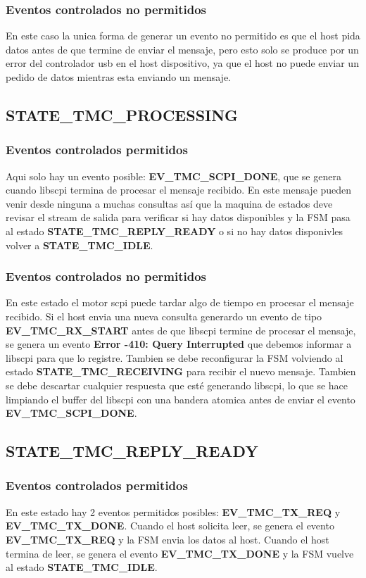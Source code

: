 \subsubsection*{Eventos controlados no permitidos}
En este caso la unica forma de generar un evento no permitido es que el host pida datos antes de que termine de enviar el mensaje, pero esto solo se produce por un error del controlador usb en el host dispositivo, ya que el host no puede enviar un pedido de datos mientras esta enviando un mensaje.

\subsection{STATE\_TMC\_PROCESSING}
\subsubsection{Eventos controlados permitidos}
Aqui solo hay un evento posible: \textbf{EV\_TMC\_SCPI\_DONE}, que se genera cuando libscpi termina de procesar el mensaje recibido. En este mensaje pueden venir desde ninguna a muchas consultas así que la maquina de estados deve revisar el stream de salida para verificar si hay datos disponibles y la FSM pasa al estado \textbf{STATE\_TMC\_REPLY\_READY} o si no hay datos disponivles volver a \textbf{STATE\_TMC\_IDLE}.

\subsubsection{Eventos controlados no permitidos}
En este estado el motor scpi puede tardar algo de tiempo en procesar el mensaje recibido. Si el host envia una nueva consulta generardo un evento de tipo \textbf{EV\_TMC\_RX\_START} antes de que libscpi termine de procesar el mensaje, se genera un evento \textbf{Error -410: Query Interrupted} que debemos informar a libscpi para que lo registre. Tambien se debe reconfigurar la FSM volviendo al estado \textbf{STATE\_TMC\_RECEIVING} para recibir el nuevo mensaje. Tambien se debe descartar cualquier respuesta que esté generando libscpi, lo que se hace limpiando el buffer del libscpi con una bandera atomica antes de enviar el evento \textbf{EV\_TMC\_SCPI\_DONE}.

\subsection{STATE\_TMC\_REPLY\_READY}
\subsubsection{Eventos controlados permitidos}
En este estado hay 2 eventos permitidos posibles: \textbf{EV\_TMC\_TX\_REQ} y \textbf{EV\_TMC\_TX\_DONE}. Cuando el host solicita leer, se genera el evento \textbf{EV\_TMC\_TX\_REQ} y la FSM envia los datos al host. Cuando el host termina de leer, se genera el evento \textbf{EV\_TMC\_TX\_DONE} y la FSM vuelve al estado \textbf{STATE\_TMC\_IDLE}.

